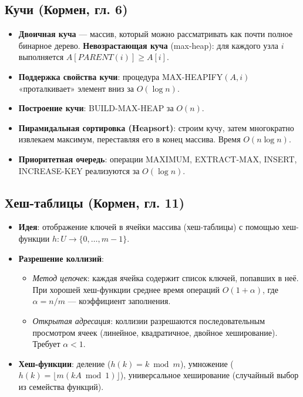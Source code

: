 \documentclass[a4paper,12pt]{article}
\begin{document}
\subsection{Кучи (Кормен, гл. 6)}
\begin{itemize}
    \item \textbf{Двоичная куча} --- массив, который можно рассматривать как почти полное бинарное дерево. \textbf{Невозрастающая куча} (max-heap): для каждого узла \( i \) выполняется \( A[PARENT(i)] \ge A[i] \).
    \item \textbf{Поддержка свойства кучи}: процедура MAX-HEAPIFY\( (A,i) \) «проталкивает» элемент вниз за \( O(\log n) \).
    \item \textbf{Построение кучи}: BUILD-MAX-HEAP за \( O(n) \).
    \item \textbf{Пирамидальная сортировка (Heapsort)}: строим кучу, затем многократно извлекаем максимум, переставляя его в конец массива. Время \( O(n\log n) \).
    \item \textbf{Приоритетная очередь}: операции MAXIMUM, EXTRACT-MAX, INSERT, INCREASE-KEY реализуются за \( O(\log n) \).
\end{itemize}

\subsection{Хеш-таблицы (Кормен, гл. 11)}
\begin{itemize}
    \item \textbf{Идея}: отображение ключей в ячейки массива (хеш-таблицы) с помощью хеш-функции \( h:U\to\{0,\dots,m-1\} \).
    \item \textbf{Разрешение коллизий}:
        \begin{itemize}
            \item \textit{Метод цепочек}: каждая ячейка содержит список ключей, попавших в неё. При хорошей хеш-функции среднее время операций \( O(1+\alpha) \), где \( \alpha=n/m \) --- коэффициент заполнения.
            \item \textit{Открытая адресация}: коллизии разрешаются последовательным просмотром ячеек (линейное, квадратичное, двойное хеширование). Требует \( \alpha<1 \).
        \end{itemize}
    \item \textbf{Хеш-функции}: деление (\( h(k)=k\bmod m \)), умножение (\( h(k)=\lfloor m(kA\bmod 1)\rfloor \)), универсальное хеширование (случайный выбор из семейства функций).
\end{itemize}
\end{document}
